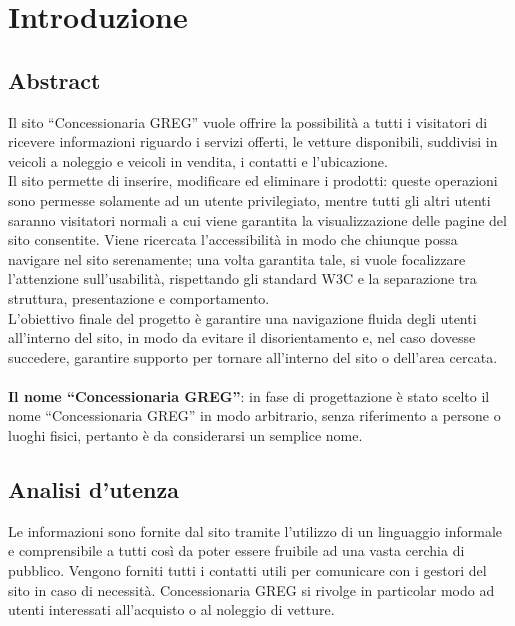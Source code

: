 \section{Introduzione}

\subsection{Abstract}
Il sito ``Concessionaria GREG'' vuole offrire la possibilità a tutti i visitatori di ricevere informazioni riguardo i servizi offerti, le vetture disponibili, suddivisi in veicoli a noleggio e veicoli in vendita, i contatti e l'ubicazione.\\

Il sito permette di inserire, modificare ed eliminare i prodotti: queste operazioni sono permesse solamente ad un utente privilegiato, mentre tutti gli altri utenti saranno visitatori normali a cui viene garantita la visualizzazione delle pagine del sito consentite. Viene ricercata l'accessibilità in modo che chiunque possa navigare nel sito serenamente; una volta garantita tale, si vuole focalizzare l'attenzione sull'usabilità, rispettando gli standard W3C e la separazione tra struttura, presentazione e comportamento.\\

L'obiettivo finale del progetto è garantire una navigazione fluida degli utenti all'interno del sito, in modo da evitare il disorientamento e, nel caso dovesse succedere, garantire supporto per tornare all'interno del sito o dell'area cercata.\\
\\
\textbf{Il nome ``Concessionaria GREG''}: in fase di progettazione è stato scelto il nome ``Concessionaria GREG'' in modo arbitrario, senza riferimento a persone o luoghi fisici, pertanto è da considerarsi un semplice nome.\\

\subsection{Analisi d'utenza}
Le informazioni sono fornite dal sito tramite l'utilizzo di un linguaggio informale e comprensibile a tutti così da poter essere fruibile ad una vasta cerchia di pubblico. Vengono forniti tutti i contatti utili per comunicare con i gestori del sito in caso di necessità. Concessionaria GREG si rivolge in particolar modo ad utenti interessati all'acquisto o al noleggio di vetture.\\

\pagebreak